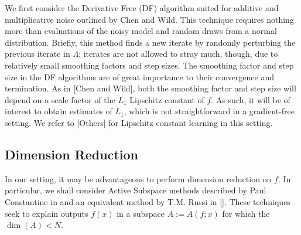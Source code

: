 \documentclass{amsart}
\begin{document}

We first consider the Derivative Free (DF) algorithm suited for additive and multiplicative noise outlined by Chen and Wild. This technique requires nothing more than evaluations of the noisy model and random draws from a normal distribution. Briefly, this method finds a new iterate by randomly perturbing the previous iterate in $\Lambda$; iterates are not allowed to stray much, though, due to relatively small smoothing factors and step sizes. The smoothing factor and step size in the DF algorithms are of great importance to their convergence and termination. As in [Chen and Wild], both the smoothing factor and step size will depend on a scale factor of the $L_1$ Lipschitz constant of $f$. As such, it will be of interest to obtain estimates of $L_1$, which is not straightforward in a gradient-free setting. We refer to [Others] for Lipschitz constant learning in this setting. 

\subsection{Dimension Reduction}

In our setting, it may be advantageous to perform dimension reduction on $f$. In particular, we shall consider Active Subspace methods described by Paul Constantine in \cite{Constantine} and an equivalent method by T.M. Russi in []. These techniques seek to explain outputs $f(x)$ in a subspace $A:=A(f;x)$ for which the $\dim (A) <N$. 

\end{document}
